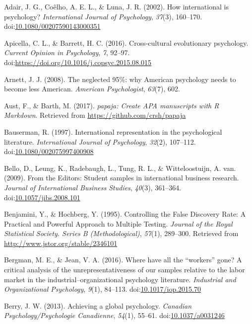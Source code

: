 \documentclass[english,man]{apa6}
\theoremstyle{definition}
\theoremstyle{definition}
\theoremstyle{remark}
\begin{document}
\hypertarget{refs}{}
\hypertarget{ref-Adair2002}{}
Adair, J. G., Coêlho, A. E. L., \& Luna, J. R. (2002). How international
is psychology? \emph{International Journal of Psychology}, \emph{37}(3),
160--170.
doi:\href{https://doi.org/10.1080/00207590143000351}{10.1080/00207590143000351}

\hypertarget{ref-Apicella2016a}{}
Apicella, C. L., \& Barrett, H. C. (2016). Cross-cultural evolutionary
psychology. \emph{Current Opinion in Psychology}, \emph{7}, 92--97.
doi:\href{https://doi.org/https://doi.org/10.1016/j.copsyc.2015.08.015}{https://doi.org/10.1016/j.copsyc.2015.08.015}

\hypertarget{ref-Arnett2008}{}
Arnett, J. J. (2008). The neglected 95\%: why American psychology needs
to become less American. \emph{American Psychologist}, \emph{63}(7),
602.

\hypertarget{ref-R-papaja}{}
Aust, F., \& Barth, M. (2017). \emph{papaja: Create APA manuscripts with
R Markdown}. Retrieved from \url{https://github.com/crsh/papaja}

\hypertarget{ref-Bauserman1997}{}
Bauserman, R. (1997). International representation in the psychological
literature. \emph{International Journal of Psychology}, \emph{32}(2),
107--112.
doi:\href{https://doi.org/10.1080/002075997400908}{10.1080/002075997400908}

\hypertarget{ref-Bello2009}{}
Bello, D., Leung, K., Radebaugh, L., Tung, R. L., \& Witteloostuijn, A.
van. (2009). From the Editors: Student samples in international business
research. \emph{Journal of International Business Studies},
\emph{40}(3), 361--364.
doi:\href{https://doi.org/10.1057/jibs.2008.101}{10.1057/jibs.2008.101}

\hypertarget{ref-Benjamini1995}{}
Benjamini, Y., \& Hochberg, Y. (1995). Controlling the False Discovery
Rate: A Practical and Powerful Approach to Multiple Testing.
\emph{Journal of the Royal Statistical Society. Series B
(Methodological)}, \emph{57}(1), 289--300. Retrieved from
\url{http://www.jstor.org/stable/2346101}

\hypertarget{ref-Bergman2016}{}
Bergman, M. E., \& Jean, V. A. (2016). Where have all the ``workers''
gone? A critical analysis of the unrepresentativeness of our samples
relative to the labor market in the industrial--organizational
psychology literature. \emph{Industrial and Organizational Psychology},
\emph{9}(1), 84--113.
doi:\href{https://doi.org/10.1017/iop.2015.70}{10.1017/iop.2015.70}

\hypertarget{ref-Berry2013}{}
Berry, J. W. (2013). Achieving a global psychology. \emph{Canadian
Psychology/Psychologie Canadienne}, \emph{54}(1), 55--61.
doi:\href{https://doi.org/10.1037/a0031246}{10.1037/a0031246}
\end{document}

